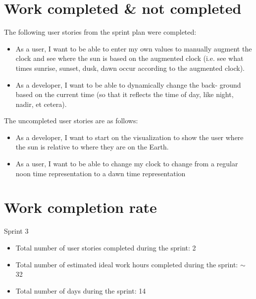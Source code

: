 \documentclass[11pt]{article}
\begin{document}
	\section{Work completed \& not completed}
		\vspace{-3mm}
		\normalsize{The following user stories from the sprint plan were completed:}\\
		\vspace{-3mm}
		\begin{itemize}
			\item As a user, I want to be able to enter my own values to manually augment the clock and see where the sun is based on the augmented clock (i.e. see what times sunrise, sunset, dusk, dawn occur according to the augmented clock).
			\item As a developer, I want to be able to dynamically change the back- ground based on the current time (so that it reflects the time of day, like night, nadir, et cetera).
		\end{itemize}
		\vspace{-3mm}
		\normalsize{The uncompleted user stories are as follows:}\\
		\vspace{-3mm}
		\begin{itemize}
			\item As a developer, I want to start on the visualization to show the user where the sun is relative to where they are on the Earth.
			\item As a user, I want to be able to change my clock to change from a regular noon time representation to a dawn time representation
		\end{itemize}
		\vspace{-3mm}

	\section{Work completion rate}
		\vspace{-3mm}
		\normalsize{Sprint 3}\\
		\vspace{-3mm}
		\begin{itemize}
			\item Total number of user stories completed during the sprint: 2
			\vspace{-3mm}
			\item Total number of estimated ideal work hours completed during the sprint: $\sim$ 32
			\vspace{-3mm}
			\item Total number of days during the sprint: 14
		\end{itemize}
\end{document}
